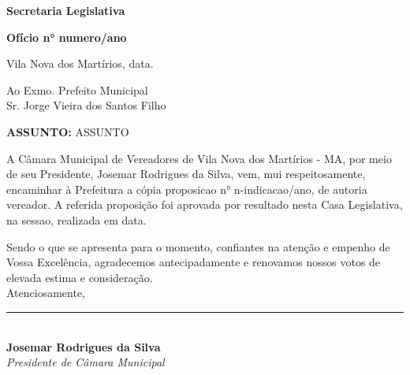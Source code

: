 \documentclass[12pt]{letter} %
\begin{document}
\begin{flushright} %
\textbf{ Secretaria Legislativa } \\ %

\begin{flushleft} %
\textbf{Ofício n° {{numero}}/{{ano}}} %
\end{flushleft}
\vspace{0,6cm} %
Vila Nova dos Martírios, {{data}}. %
\end{flushright}

\vspace{1cm}
\begin{flushleft} %
Ao Exmo. Prefeito Municipal\\
Sr. Jorge Vieira dos Santos Filho\\
\end{flushleft}
\vspace{1,5cm}
\begin{justify}
\textbf{ASSUNTO:} \MakeUppercase{ {{assunto}} } %
\end{justify}

\begin{justify}
	A Câmara Municipal de Vereadores de Vila Nova dos Martírios - MA, por meio de seu Presidente, Josemar Rodrigues da Silva, vem, mui respeitosamente, encaminhar à Prefeitura a cópia {{proposicao}} n° {{n-indicacao}}/{{ano}}, de autoria {{vereador}}. A referida proposição foi aprovada por {{resultado}} nesta Casa Legislativa, na {{sessao}}, realizada em {{data}}. \\[1ex]%
\end{justify}

Sendo o que se apresenta para o momento, confiantes na atenção e empenho de 
Vossa Excelência, agradecemos antecipadamente e renovamos nossos votos de 
elevada estima e consideração. \\

Atenciosamente, 

\vspace{1cm}

\begin{center}
\rule{8cm}{0.4pt} \\[1ex]
\textbf{Josemar Rodrigues da Silva} \\[0.5ex]
\textit{Presidente de Câmara Municipal}
\end{center}
\end{document}
